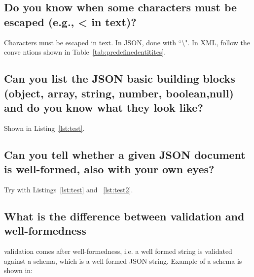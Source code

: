 \documentclass{article}
\begin{document}
\subsection{Do you know when some characters must be escaped (e.g., < in text)?}

Characters must be escaped in text. In JSON, done with ``\textbackslash". In XML, follow the conve
ntions shown in Table~\ref{tab:predefinedentitites}.

\subsection{Can you list the JSON basic building blocks (object, array, string, number, boolean,null) and do you know what they look like?}

Shown in Listing~\ref{lst:test}.

\subsection{Can you tell whether a given JSON document is well-formed, also with your own eyes?}

Try with Listings~\ref{lst:test} and ~\ref{lst:test2}.

\subsection{What is the difference between validation and well-formedness}\label{diffwellformedvalidity}

validation comes after well-formedness, i.e. a well formed string is validated against a schema, which is a well-formed JSON string. Example of a schema is shown in:
\end{document}
